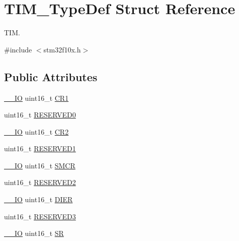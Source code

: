 \hypertarget{struct_t_i_m___type_def}{\section{T\-I\-M\-\_\-\-Type\-Def Struct Reference}
\label{struct_t_i_m___type_def}
}


T\-I\-M.  




{\ttfamily \#include $<$stm32f10x.\-h$>$}

\subsection*{Public Attributes}
\begin{DoxyCompactItemize}
\item 
\hyperlink{group___c_m_s_i_s__core__definitions_gaec43007d9998a0a0e01faede4133d6be}{\-\_\-\-\_\-\-I\-O} uint16\-\_\-t \hyperlink{struct_t_i_m___type_def_a410988826004fdd21d55071215144ba9}{C\-R1}
\item 
uint16\-\_\-t \hyperlink{struct_t_i_m___type_def_a88caad1e82960cc6df99d935ece26c1b}{R\-E\-S\-E\-R\-V\-E\-D0}
\item 
\hyperlink{group___c_m_s_i_s__core__definitions_gaec43007d9998a0a0e01faede4133d6be}{\-\_\-\-\_\-\-I\-O} uint16\-\_\-t \hyperlink{struct_t_i_m___type_def_a954eb69fd4e2e6b43ba6c80986f691d8}{C\-R2}
\item 
uint16\-\_\-t \hyperlink{struct_t_i_m___type_def_a59c46ac3a56c6966a7f8f379a2fd1e3e}{R\-E\-S\-E\-R\-V\-E\-D1}
\item 
\hyperlink{group___c_m_s_i_s__core__definitions_gaec43007d9998a0a0e01faede4133d6be}{\-\_\-\-\_\-\-I\-O} uint16\-\_\-t \hyperlink{struct_t_i_m___type_def_a476012f1b4567ffc21ded0b5fd50985e}{S\-M\-C\-R}
\item 
uint16\-\_\-t \hyperlink{struct_t_i_m___type_def_af62f86f55f2a387518f3de10d916eb7c}{R\-E\-S\-E\-R\-V\-E\-D2}
\item 
\hyperlink{group___c_m_s_i_s__core__definitions_gaec43007d9998a0a0e01faede4133d6be}{\-\_\-\-\_\-\-I\-O} uint16\-\_\-t \hyperlink{struct_t_i_m___type_def_a25b145e57a694bb384eee08fcd107c3a}{D\-I\-E\-R}
\item 
uint16\-\_\-t \hyperlink{struct_t_i_m___type_def_a8f952613a22049f3ea2b50b7e0d10472}{R\-E\-S\-E\-R\-V\-E\-D3}
\item 
\hyperlink{group___c_m_s_i_s__core__definitions_gaec43007d9998a0a0e01faede4133d6be}{\-\_\-\-\_\-\-I\-O} uint16\-\_\-t \hyperlink{struct_t_i_m___type_def_af686e22c1792dc59dfeffe451d47cf13}{S\-R}

\end{DoxyCompactItemize}
